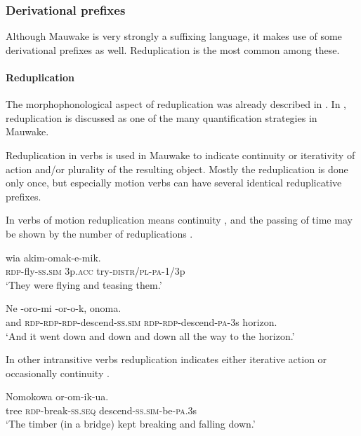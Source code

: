 \subsubsection{Derivational prefixes}
{}
Although Mauwake is very strongly a suffixing language, it makes use of some derivational prefixes as well. Reduplication is the most common among these. 

\paragraph{Reduplication}\label{sec:3.8.2.4.1}
{}
The morphophonological aspect of reduplication was already described in . In , reduplication is discussed as one of the many quantification strategies in Mauwake.

Reduplication in verbs is used in Mauwake to indicate continuity or iterativity of action and/or plurality of the resulting object. Mostly the reduplication is done only once, but especially motion verbs can have several identical reduplicative prefixes. 

In verbs of motion reduplication means continuity , and the passing of time may be shown by the number of reduplications .

\ea%
\label{ex:3:x218}
\gll {} wia akim-omak-e-mik. \\
\textsc{rdp}-fly-\textsc{ss}.\textsc{sim} 3p.\textsc{acc} try-\textsc{distr}/\textsc{pl}-\textsc{pa}-1/3p \\
\glt`They were flying and teasing them.' 
\z

\ea%
\label{ex:3:x216}
\gll Ne -oro-mi -or-o-k, onoma.\\
and \textsc{rdp}-\textsc{rdp}-\textsc{rdp}-descend-\textsc{ss}.\textsc{sim} \textsc{rdp}-\textsc{rdp}-descend-\textsc{pa}-3s horizon.\\
\glt`And it went down and down and down all the way to the horizon.'
\z

In other intransitive verbs reduplication indicates either iterative action  or occasionally continuity .

\ea%
\label{ex:3:x217}
\gll Nomokowa  or-om-ik-ua. \\
tree \textsc{rdp}-break-\textsc{ss}.\textsc{seq} descend-\textsc{ss}.\textsc{sim}-be-\textsc{pa}.3s\\
\glt`The timber (in a bridge) kept breaking and falling down.' 
\z

